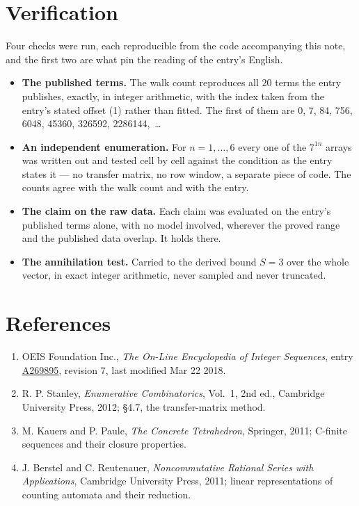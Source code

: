 \documentclass[11pt]{article}
\theoremstyle{definition}
\begin{document}
\section{Verification}

Four checks were run, each reproducible from the code accompanying this note, and the first two are what pin the reading of the entry's English.

\begin{itemize}

\item {\bfseries The published terms.} The walk count reproduces all 20 terms the entry publishes, exactly, in integer arithmetic, with the index taken from the entry's stated offset (1) rather than fitted. The first of them are 0, 7, 84, 756, 6048, 45360, 326592, 2286144,~\dots

\item {\bfseries An independent enumeration.} For $n = 1,\dots,6$ every one of the $7^{1n}$ arrays was written out and tested cell by cell against the condition as the entry states it --- no transfer matrix, no row window, a separate piece of code. The counts agree with the walk count and with the entry.

\item {\bfseries The claim on the raw data.} Each claim was evaluated on the entry's published terms alone, with no model involved, wherever the proved range and the published data overlap. It holds there.

\item {\bfseries The annihilation test.} Carried to the derived bound $S = 3$ over the whole vector, in exact integer arithmetic, never sampled and never truncated.

\end{itemize}

\section{References}

\begin{enumerate}

\item OEIS Foundation Inc., \emph{The On-Line Encyclopedia of Integer Sequences}, entry \href{https://oeis.org/A269895}{A269895}, revision 7, last modified Mar 22 2018.

\item R. P. Stanley, \emph{Enumerative Combinatorics}, Vol.~1, 2nd ed., Cambridge University Press, 2012; \S4.7, the transfer-matrix method.

\item M. Kauers and P. Paule, \emph{The Concrete Tetrahedron}, Springer, 2011; C-finite sequences and their closure properties.

\item J. Berstel and C. Reutenauer, \emph{Noncommutative Rational Series with Applications}, Cambridge University Press, 2011; linear representations of counting automata and their reduction.

\end{enumerate}
\end{document}
